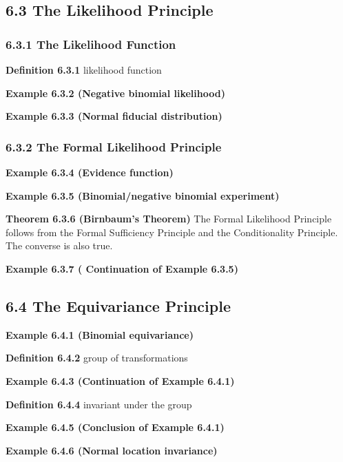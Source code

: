 \documentclass[6pt,Portrait]{article}
\begin{document}
\hypertarget{the-likelihood-principle}{%
\subsection{6.3 The Likelihood
Principle}\label{the-likelihood-principle}}

\hypertarget{the-likelihood-function}{%
\subsubsection{6.3.1 The Likelihood
Function}\label{the-likelihood-function}}

\textbf{Definition 6.3.1} likelihood function

\textbf{Example 6.3.2 (Negative binomial likelihood)}

\textbf{Example 6.3.3 (Normal fiducial distribution)}

\hypertarget{the-formal-likelihood-principle}{%
\subsubsection{6.3.2 The Formal Likelihood
Principle}\label{the-formal-likelihood-principle}}

\textbf{Example 6.3.4 (Evidence function)}

\textbf{Example 6.3.5 (Binomial/negative binomial experiment)}

\textbf{Theorem 6.3.6 (Birnbaum's Theorem)} The Formal Likelihood
Principle follows from the Formal Sufficiency Principle and the
Conditionality Principle. The converse is also true.

\textbf{Example 6.3.7 ( Continuation of Example 6.3.5)}

\hypertarget{the-equivariance-principle}{%
\subsection{6.4 The Equivariance
Principle}\label{the-equivariance-principle}}

\textbf{Example 6.4.1 (Binomial equivariance)}

\textbf{Definition 6.4.2} group of transformations

\textbf{Example 6.4.3 (Continuation of Example 6.4.1)}

\textbf{Definition 6.4.4} invariant under the group

\textbf{Example 6.4.5 (Conclusion of Example 6.4.1)}

\textbf{Example 6.4.6 (Normal location invariance)}
\end{document}
